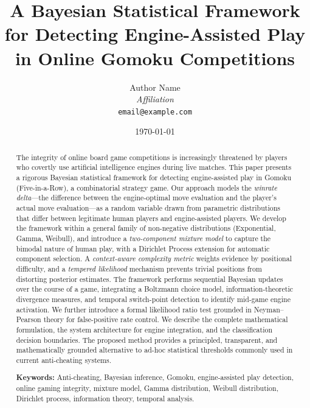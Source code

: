\documentclass[11pt,a4paper]{article}
\title{
    A Bayesian Statistical Framework for Detecting Engine-Assisted Play\\
    in Online Gomoku Competitions
}
\author{
    Author Name \\
    \textit{Affiliation} \\
    \texttt{email@example.com}
}
\date{\today}
\begin{document}
\maketitle

\begin{abstract}
The integrity of online board game competitions is increasingly threatened by
players who covertly use artificial intelligence engines during live matches.
This paper presents a rigorous Bayesian statistical framework for detecting
engine-assisted play in Gomoku (Five-in-a-Row), a combinatorial strategy game.
Our approach models the \emph{winrate delta}---the difference between the
engine-optimal move evaluation and the player's actual move evaluation---as a
random variable drawn from parametric distributions that differ between
legitimate human players and engine-assisted players. We develop the framework
within a general family of non-negative distributions (Exponential, Gamma,
Weibull), and introduce a \emph{two-component mixture model} to capture the
bimodal nature of human play, with a Dirichlet Process extension for
automatic component selection. A \emph{context-aware complexity metric} weights
evidence by positional difficulty, and a \emph{tempered likelihood} mechanism
prevents trivial positions from distorting posterior estimates. The framework
performs sequential Bayesian updates over the course of a game, integrating
a Boltzmann choice model, information-theoretic divergence measures, and
temporal switch-point detection to identify mid-game engine activation. We
further introduce a formal likelihood ratio test grounded in Neyman--Pearson
theory for false-positive rate control. We describe the complete mathematical
formulation, the system architecture for engine integration, and the
classification decision boundaries. The proposed method provides a principled,
transparent, and mathematically grounded alternative to ad-hoc statistical
thresholds commonly used in current anti-cheating systems.

\medskip
\noindent
\textbf{Keywords:} Anti-cheating, Bayesian inference, Gomoku, engine-assisted
play detection, online gaming integrity, mixture model, Gamma distribution,
Weibull distribution, Dirichlet process, information theory, temporal analysis.
\end{abstract}

\end{document}

